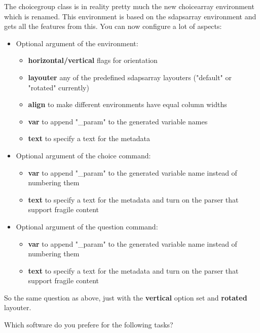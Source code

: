 \documentclass[
  english,
  print_questionnaire_id,
  oneside,
  pagemark,
  stamp]{sdapsclassic}
\begin{document}
\begin{questionnaire}
    The choicegroup class is in reality pretty much the new choicearray environment
    which is renamed. This environment is based on the sdapsarray environment and
    gets all the features from this. You can now configure a lot of aspects:
    \begin{itemize}
      \item Optional argument of the environment:
        \begin{itemize}
          \item {\bfseries horizontal/vertical} flags for orientation
          \item {\bfseries layouter} any of the predefined sdapsarray layouters ("default" or "rotated" currently)
          \item {\bfseries align} to make different environments have equal column widths
          \item {\bfseries var} to append "\_param" to the generated variable names
          \item {\bfseries text} to specify a text for the metadata
        \end{itemize} 
      \item Optional argument of the choice command:
        \begin{itemize}
          \item {\bfseries var} to append "\_param" to the generated variable name instead of numbering them
          \item {\bfseries text} to specify a text for the metadata and turn on the parser that support fragile content
        \end{itemize} 
      \item Optional argument of the question command:
        \begin{itemize}
          \item {\bfseries var} to append "\_param" to the generated variable name instead of numbering them
          \item {\bfseries text} to specify a text for the metadata and turn on the parser that support fragile content
        \end{itemize} 
    \end{itemize} 

    So the same question as above, just with the {\bfseries vertical} option set and {\bfseries rotated} layouter.

    \begin{choicegroup}[vertical,layouter=rotated,var=testchoice]{Which software do you prefere for the following tasks?}
      \groupaddchoice[text=LaTeX,var=latex]{\LaTeX}


\end{choicegroup}
\end{questionnaire}
\end{document}
